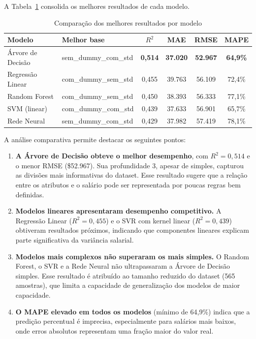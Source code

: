 \documentclass[12pt]{article}
\begin{document}
A Tabela~\ref{tab:comparacao_final} consolida os melhores resultados de cada modelo.

\begin{table}[H]
\centering
\caption{Comparação dos melhores resultados por modelo}
\label{tab:comparacao_final}
\begin{tabular}{|l|l|c|c|c|c|}
\hline
\textbf{Modelo} & \textbf{Melhor base} & \textbf{$R^2$} & \textbf{MAE} & \textbf{RMSE} & \textbf{MAPE} \\ \hline
Árvore de Decisão & sem\_dummy\_com\_std & \textbf{0,514} & \textbf{37.020} & \textbf{52.967} & \textbf{64,9\%} \\ \hline
Regressão Linear & com\_dummy\_sem\_std & 0,455 & 39.763 & 56.109 & 72,4\% \\ \hline
Random Forest & com\_dummy\_sem\_std & 0,450 & 38.393 & 56.333 & 77,1\% \\ \hline
SVM (linear) & com\_dummy\_com\_std & 0,439 & 37.633 & 56.901 & 65,7\% \\ \hline
Rede Neural & sem\_dummy\_com\_std & 0,429 & 37.982 & 57.419 & 78,1\% \\ \hline
\end{tabular}
\end{table}

A análise comparativa permite destacar os seguintes pontos:

\begin{enumerate}
    \item \textbf{A Árvore de Decisão obteve o melhor desempenho}, com $R^2 = 0{,}514$ e o menor RMSE (\$52.967). Sua profundidade 3, apesar de simples, capturou as divisões mais informativas do dataset. Esse resultado sugere que a relação entre os atributos e o salário pode ser representada por poucas regras bem definidas.

    \item \textbf{Modelos lineares apresentaram desempenho competitivo.} A Regressão Linear ($R^2 = 0{,}455$) e o SVR com kernel linear ($R^2 = 0{,}439$) obtiveram resultados próximos, indicando que componentes lineares explicam parte significativa da variância salarial.

    \item \textbf{Modelos mais complexos não superaram os mais simples.} O Random Forest, o SVR e a Rede Neural não ultrapassaram a Árvore de Decisão simples. Esse resultado é atribuído ao tamanho reduzido do dataset (565 amostras), que limita a capacidade de generalização dos modelos de maior capacidade.

    \item \textbf{O MAPE elevado em todos os modelos} (mínimo de 64,9\%) indica que a predição percentual é imprecisa, especialmente para salários mais baixos, onde erros absolutos representam uma fração maior do valor real.
\end{enumerate}
\end{document}
